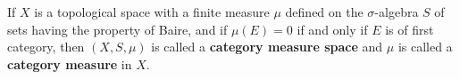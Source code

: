 If $X$ is a topological space with a finite measure $\mu$ defined on the $\sigma$-algebra $S$ of sets having the property of Baire, and if $\mu(E) = 0$ if and only if $E$ is of first category, then $(X, S, \mu)$ is called a \textbf{category measure space} and $\mu$ is called a \textbf{category measure} in $X$.
